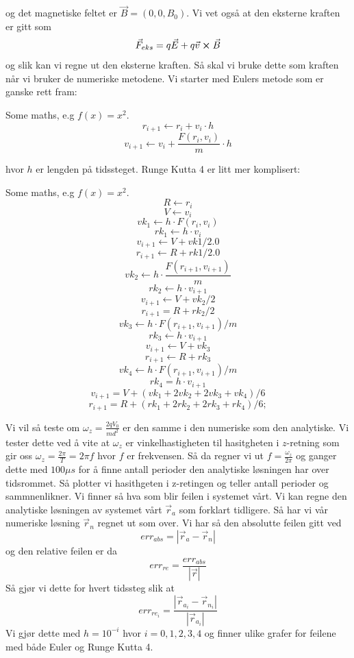 \documentclass[reprint,english,notitlepage, nofootinbib]{revtex4-1}  %
\begin{document}
og det magnetiske feltet er $\vec{B}=(0,0,B_0)$. Vi vet også at den eksterne kraften er gitt som
$$
\vec{F}_{eks}=q\vec{E}+q\vec{v}\cross \vec{B}
$$
og slik kan vi regne ut den eksterne kraften.
Så skal vi bruke dette som kraften når vi bruker de numeriske metodene.
Vi starter med Eulers metode som er ganske rett fram:
\begin{algorithm}[H]
	\begin{algorithmic}
		\State Some maths, e.g $f(x) = x^2$. 
		\State $$
		r_{i+1}\leftarrow r_i+v_i \cdot h
		$$
		\State $$
		v_{i+1}\leftarrow v_i+\frac{F(r_i, v_i)}{m}\cdot h
		$$
		\EndFor
	\end{algorithmic}
\end{algorithm}
hvor $h$ er lengden på tidssteget. \newline
Runge Kutta 4 er litt mer komplisert:
\begin{algorithm}[H]
	\begin{algorithmic}
		\State Some maths, e.g $f(x) = x^2$. 
		\For{$i = 0, 1, ..., N-1$}
		\State $$
		R\leftarrow r_i
		$$$$
		V\leftarrow v_i
		$$$$
		vk_1\leftarrow h\cdot F(r_i, v_i)
		$$$$
		rk_1\leftarrow h\cdot v_i
		$$$$
		v_{i+1}\leftarrow V+vk1/2.0
		$$$$
		r_{i+1}\leftarrow R+rk1/2.0
		$$
		$$
		vk_2\leftarrow h\cdot \frac{F(r_{i+1},v_{i+1})}{m}
		$$$$
		rk_2\leftarrow h\cdot v_{i+1}
		$$
		$$
		v_{i+1}\leftarrow V+vk_2/2
		$$$$
		r_{i+1}=R+rk_2/2
		$$
		$$
		vk_3\leftarrow h\cdot F(r_{i+1}, v_{i+1})/m
		$$$$
		rk_3\leftarrow h\cdot v_{i+1}
		$$
		$$
		v_{i+1}\leftarrow V+vk_3$$$$
		r_{i+1}\leftarrow R+rk_3
		$$
		$$
		vk_4\leftarrow h\cdot  F(r_{i+1}, v_{i+1})/m$$$$
		rk_4=h\cdot v_{i+1}
		$$
		$$
		v_{i+1}=V+(vk_1+2vk_2+2vk_3+vk_4)/6$$$$
		r_{i+1}=R+(rk_1+2rk_2+2rk_3+rk_4)/6;
		$$
		\EndFor
	\end{algorithmic}
\end{algorithm}
Vi vil så teste om $\omega_z=\frac{2qV_0}{md^2}$ er den samme i den numeriske som den analytiske. Vi tester dette ved å vite at $\omega_z$ er vinkelhastigheten til hasitgheten i $z$-retning som gir oss $\omega_z=\frac{2\pi}{T}=2\pi f$ hvor $f$ er frekvensen. Så da regner vi ut $f=\frac{\omega_z}{2\pi}$ og ganger dette med $100\mu s$ for å finne antall perioder den analytiske løsningen har over tidsrommet. Så plotter vi hasithgeten i z-retingen og teller antall perioder og sammnenlikner. \newline 
Vi finner så hva som blir feilen i systemet vårt. Vi kan regne den analytiske løsningen av systemet vårt $\vec{r}_a$ som forklart tidligere. Så har vi vår numeriske løsning $\vec{r}_n$ regnet ut som over. Vi har så den absolutte feilen gitt ved
$$
err_{abs}=|\vec{r}_{a}-\vec{r}_{n}|
$$
og den relative feilen er da
$$
err_{re}=\frac{err_{abs}}{|\vec{r}|}
$$
Så gjør vi dette for hvert tidssteg slik at
$$
err_{re_i}=\frac{|\vec{r}_{a_i}-\vec{r}_{n_i}|}{|\vec{r}_{a_i}|}
$$
Vi gjør dette med $h=10^{-i}$ hvor $i=0,1,2,3,4$ og finner ulike grafer for feilene med både Euler og Runge Kutta 4.
\end{document}

